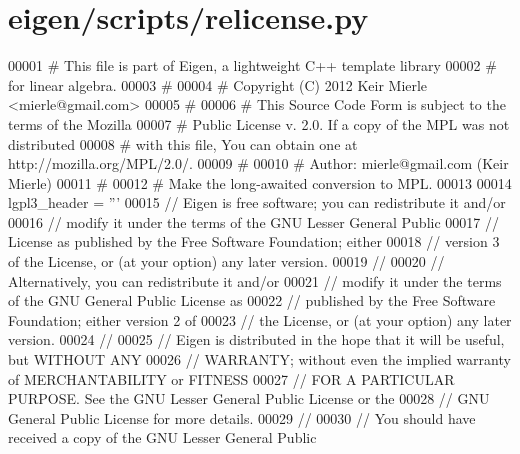 \hypertarget{eigen_2scripts_2relicense_8py_source}{}\section{eigen/scripts/relicense.py}
\label{eigen_2scripts_2relicense_8py_source}

\begin{DoxyCode}
00001 \textcolor{comment}{# This file is part of Eigen, a lightweight C++ template library}
00002 \textcolor{comment}{# for linear algebra.}
00003 \textcolor{comment}{#}
00004 \textcolor{comment}{# Copyright (C) 2012 Keir Mierle <mierle@gmail.com>}
00005 \textcolor{comment}{#}
00006 \textcolor{comment}{# This Source Code Form is subject to the terms of the Mozilla}
00007 \textcolor{comment}{# Public License v. 2.0. If a copy of the MPL was not distributed}
00008 \textcolor{comment}{# with this file, You can obtain one at http://mozilla.org/MPL/2.0/.}
00009 \textcolor{comment}{#}
00010 \textcolor{comment}{# Author: mierle@gmail.com (Keir Mierle)}
00011 \textcolor{comment}{#}
00012 \textcolor{comment}{# Make the long-awaited conversion to MPL.}
00013 
00014 lgpl3\_header = \textcolor{stringliteral}{'''}
00015 \textcolor{stringliteral}{// Eigen is free software; you can redistribute it and/or}
00016 \textcolor{stringliteral}{// modify it under the terms of the GNU Lesser General Public}
00017 \textcolor{stringliteral}{// License as published by the Free Software Foundation; either}
00018 \textcolor{stringliteral}{// version 3 of the License, or (at your option) any later version.}
00019 \textcolor{stringliteral}{//}
00020 \textcolor{stringliteral}{// Alternatively, you can redistribute it and/or}
00021 \textcolor{stringliteral}{// modify it under the terms of the GNU General Public License as}
00022 \textcolor{stringliteral}{// published by the Free Software Foundation; either version 2 of}
00023 \textcolor{stringliteral}{// the License, or (at your option) any later version.}
00024 \textcolor{stringliteral}{//}
00025 \textcolor{stringliteral}{// Eigen is distributed in the hope that it will be useful, but WITHOUT ANY}
00026 \textcolor{stringliteral}{// WARRANTY; without even the implied warranty of MERCHANTABILITY or FITNESS}
00027 \textcolor{stringliteral}{// FOR A PARTICULAR PURPOSE. See the GNU Lesser General Public License or the}
00028 \textcolor{stringliteral}{// GNU General Public License for more details.}
00029 \textcolor{stringliteral}{//}
00030 \textcolor{stringliteral}{// You should have received a copy of the GNU Lesser General Public}

\end{DoxyCode}
